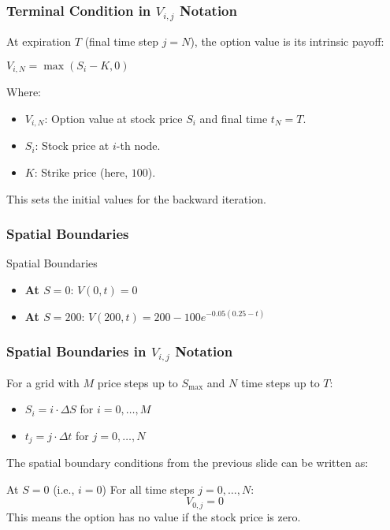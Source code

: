 \documentclass[aspectratio=169]{beamer}
\begin{document}
\begin{frame}
\frametitle{Terminal Condition in $V_{i,j}$ Notation}
At expiration $T$ (final time step $j=N$), the option value is its intrinsic payoff:

$V_{i,N} = \max(S_i - K, 0)$

Where:
\begin{itemize}
    \item $V_{i,N}$: Option value at stock price $S_i$ and final time $t_N = T$.
    \item $S_i$: Stock price at $i$-th node.
    \item $K$: Strike price (here, $100$).
\end{itemize}
This sets the initial values for the backward iteration.
\end{frame}

\begin{frame}
\frametitle{Spatial Boundaries}
\begin{block}{Spatial Boundaries}
\begin{itemize}
\item \textbf{At $S = 0$}: $V(0, t) = 0$
\item \textbf{At $S = 200$}: $V(200, t) = 200 - 100e^{-0.05(0.25-t)}$
\end{itemize}
\end{block}
\end{frame}

\begin{frame}
\frametitle{Spatial Boundaries in $V_{i,j}$ Notation}
For a grid with $M$ price steps up to $S_{\text{max}}$ and $N$ time steps up to $T$:
\begin{itemize}
    \item $S_i = i \cdot \Delta S$ for $i = 0, \dots, M$
    \item $t_j = j \cdot \Delta t$ for $j = 0, \dots, N$
\end{itemize}

\end{frame}

\begin{frame}
  
The spatial boundary conditions from the previous slide can be written as:
  \begin{block}{At $S = 0$ (i.e., $i=0$)}
For all time steps $j = 0, \dots, N$:
\[V_{0,j} = 0\]
This means the option has no value if the stock price is zero.
\end{block}
\end{frame}
\end{document}
